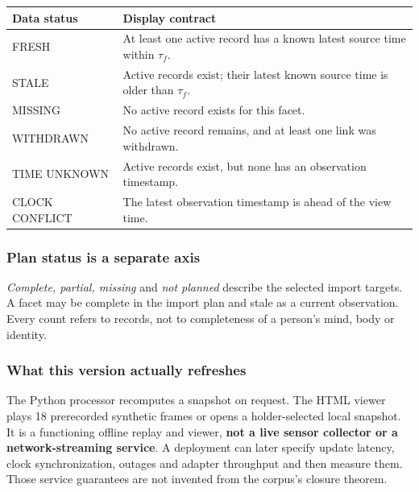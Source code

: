 \documentclass[11pt,a4paper]{article}
\begin{document}
\begin{center}\small\begin{tabularx}{\textwidth}{@{}p{}X@{}}\toprule
\textbf{Data status} & \textbf{Display contract}\\\midrule
FRESH & At least one active record has a known latest source time within $\tau_f$.\\[4pt]
STALE & Active records exist; their latest known source time is older than $\tau_f$.\\[4pt]
MISSING & No active record exists for this facet.\\[4pt]
WITHDRAWN & No active record remains, and at least one link was withdrawn.\\[4pt]
TIME UNKNOWN & Active records exist, but none has an observation timestamp.\\[4pt]
CLOCK CONFLICT & The latest observation timestamp is ahead of the view time.\\\bottomrule
\end{tabularx}\end{center}

\subsubsection{Plan status is a separate axis}
\emph{Complete, partial, missing} and \emph{not planned} describe the selected import targets. A facet may be complete in the import plan and stale as a current observation. Every count refers to records, not to completeness of a person's mind, body or identity.

\subsubsection{What this version actually refreshes}
The Python processor recomputes a snapshot on request. The HTML viewer plays 18 prerecorded synthetic frames or opens a holder-selected local snapshot. It is a functioning offline replay and viewer, \textbf{not a live sensor collector or a network-streaming service}. A deployment can later specify update latency, clock synchronization, outages and adapter throughput and then measure them. Those service guarantees are not invented from the corpus's closure theorem.
\end{document}
